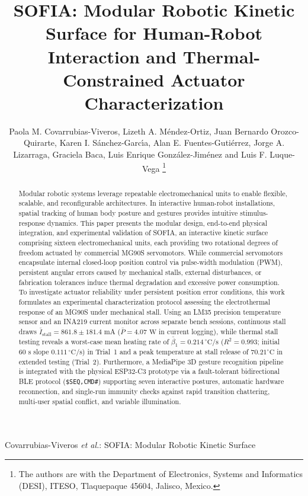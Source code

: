 \documentclass[lettersize,journal]{IEEEtran}
\begin{document}
	
	\title{SOFIA: Modular Robotic Kinetic Surface for Human-Robot Interaction and Thermal-Constrained Actuator Characterization}
	
	\author{Paola M. Covarrubias-Viveros, Lizeth A. M{\'e}ndez-Ortiz, Juan Bernardo Orozco-Quirarte, Karen I. S{\'a}nchez-Garc{\'\i}a, Alan E. Fuentes-Guti{\'e}rrez, Jorge A. Lizarraga, Graciela Baca, Luis Enrique Gonz{\'a}lez-Jim{\'e}nez and Luis F. Luque-Vega
		\thanks{The authors are with the Department of Electronics, Systems and
			Informatics (DESI), ITESO, Tlaquepaque 45604, Jalisco, Mexico.}}
	
	{Covarrubias-Viveros \MakeLowercase{\textit{et al.}}: SOFIA: Modular Robotic Kinetic Surface}
	
	\maketitle
	
	\begin{abstract}
		Modular robotic systems leverage repeatable electromechanical units to enable flexible, scalable, and reconfigurable architectures. In interactive human-robot installations, spatial tracking of human body posture and gestures provides intuitive stimulus-response dynamics. This paper presents the modular design, end-to-end physical integration, and experimental validation of SOFIA, an interactive kinetic surface comprising sixteen electromechanical units, each providing two rotational degrees of freedom actuated by commercial MG90S servomotors. While commercial servomotors encapsulate internal closed-loop position control via pulse-width modulation (PWM), persistent angular errors caused by mechanical stalls, external disturbances, or fabrication tolerances induce thermal degradation and excessive power consumption. To investigate actuator reliability under persistent position error conditions, this work formulates an experimental characterization protocol assessing the electrothermal response of an MG90S under mechanical stall. Using an LM35 precision temperature sensor and an INA219 current monitor across separate bench sessions, continuous stall draws $\bar{I}_{\text{stall}} = 861.8 \pm 181.4\text{ mA}$ ($\bar{P} = 4.07\text{ W}$ in current logging), while thermal stall testing reveals a worst-case mean heating rate of $\bar{\beta}_1 = 0.214\,^\circ\text{C/s}$ ($R^2 = 0.993$; initial $60\text{ s}$ slope $0.111\,^\circ\text{C/s}$) in Trial~1 and a peak temperature at stall release of $70.21^\circ\text{C}$ in extended testing (Trial~2). Furthermore, a MediaPipe 3D gesture recognition pipeline is integrated with the physical ESP32-C3 prototype via a fault-tolerant bidirectional BLE protocol (\texttt{\$SEQ,CMD\#}) supporting seven interactive postures, automatic hardware reconnection, and single-run immunity checks against rapid transition chattering, multi-user spatial conflict, and variable illumination.
	\end{abstract}
	
\end{document}
